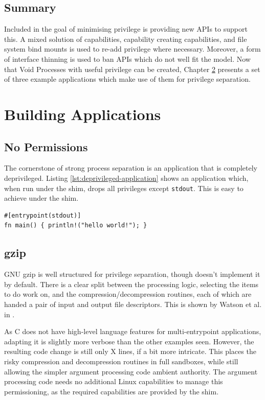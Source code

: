 \documentclass[12pt,a4paper,twoside]{report}
\begin{document}
\section{Summary}

Included in the goal of minimising privilege is providing new APIs to support this. A mixed solution of capabilities, capability creating capabilities, and file system bind mounts is used to re-add privilege where necessary. Moreover, a form of interface thinning is used to ban APIs which do not well fit the model. Now that Void Processes with useful privilege can be created, Chapter \ref{chap:building-apps} presents a set of three example applications which make use of them for privilege separation.


\chapter{Building Applications}
\label{chap:building-apps}

\section{No Permissions}

The cornerstone of strong process separation is an application that is completely deprivileged. Listing \ref{lst:deprivileged-application} shows an application which, when run under the shim, drops all privileges except \texttt{stdout}. This is easy to achieve under the shim.

\begin{lstlisting}[float,label={lst:deprivileged-application}]
#[entrypoint(stdout)]
fn main() { println!("hello world!"); }
\end{lstlisting}

\section{gzip}

GNU gzip \citep{gailly_gzip_2020} is well structured for privilege separation, though doesn't implement it by default. There is a clear split between the processing logic, selecting the items to do work on, and the compression/decompression routines, each of which are handed a pair of input and output file descriptors. This is shown by Watson et al. in \cite{watson_capsicum_2010}.

As C does not have high-level language features for multi-entrypoint applications, adapting it is slightly more verbose than the other examples seen. However, the resulting code change is still only X lines, if a bit more intricate. This places the risky compression and decompression routines in full sandboxes, while still allowing the simpler argument processing code ambient authority. The argument processing code needs no additional Linux capabilities to manage this permissioning, as the required capabilities are provided by the shim.
\end{document}
